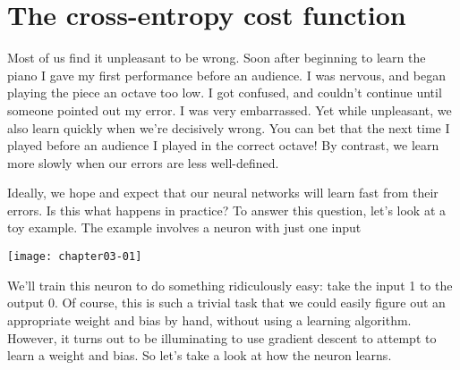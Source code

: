 \section{The cross-entropy cost function}
\label{sec:Thecross-entropycostfunction}

Most of us find it unpleasant to be wrong. Soon after beginning to learn the piano I gave my first performance before an audience. I was nervous, and began playing the piece an octave too low. I got confused, and couldn't continue until someone pointed out my error. I was very embarrassed. Yet while unpleasant, we also learn quickly when we're decisively wrong. You can bet that the next time I played before an audience I played in the correct octave! By contrast, we learn more slowly when our errors are less well-defined.

Ideally, we hope and expect that our neural networks will learn fast from their errors. Is this what happens in practice? To answer this question, let's look at a toy example. The example involves a neuron with just one input

\begin{marginfigure}
\texttt{[image: chapter03-01]}
\end{marginfigure}


We'll train this neuron to do something ridiculously easy: take the input 1 to the output 0. Of course, this is such a trivial task that we could easily figure out an appropriate weight and bias by hand, without using a learning algorithm. However, it turns out to be illuminating to use gradient descent to attempt to learn a weight and bias. So let's take a look at how the neuron learns.


